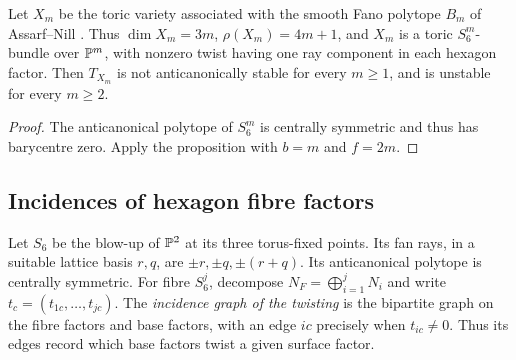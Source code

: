 \begin{corollary}\label{interact:ANexamples}
Let $X_m$ be the toric variety associated with the smooth Fano polytope
$B_m$ of Assarf--Nill \cite[Definition~41 and Proposition~43]{AssarfNill2016}.
Thus $\dim X_m=3m$, $\rho(X_m)=4m+1$, and $X_m$ is a toric
$S_6^m$-bundle over $\mathbb{P}^m$, with nonzero twist having one ray component
in each hexagon factor. Then $T_{X_m}$ is not anticanonically stable
for every $m\ge1$, and is unstable for every $m\ge2$.
\end{corollary}
\begin{proof}
The anticanonical polytope of $S_6^m$ is centrally symmetric and thus
has barycentre zero. Apply the proposition with $b=m$ and $f=2m$.
\end{proof}

\subsection{Incidences of hexagon fibre factors}
Let $S_6$ be the blow-up of $\mathbb{P}^2$ at its three torus-fixed points.
Its fan rays, in a suitable lattice basis $r,q$, are
$\pm r,\pm q,\pm(r+q)$. Its anticanonical polytope is centrally symmetric.
For fibre $S_6^j$, decompose $N_F=\bigoplus_{i=1}^jN_i$ and write
$t_c=(t_{1c},\ldots,t_{jc})$. The \emph{incidence graph of the twisting}
is the bipartite graph on the fibre factors and base factors, with an
edge $ic$ precisely when $t_{ic}\ne0$. Thus its edges record which base
factors twist a given surface factor.

